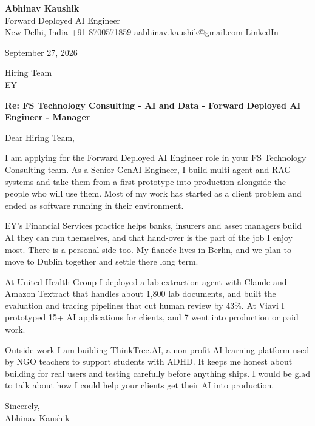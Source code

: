 \documentclass[11pt,a4paper]{article}
\begin{document}
{\Large\bfseries Abhinav Kaushik}\\
Forward Deployed AI Engineer\\
New Delhi, India \textbar{} +91 8700571859 \textbar{} \href{mailto:aabhinav.kaushik@gmail.com}{aabhinav.kaushik@gmail.com} \textbar{} \href{https://www.linkedin.com/in/abhinav-kaushik10/}{LinkedIn}  

September 27, 2026

Hiring Team\\
EY

\textbf{Re: FS Technology Consulting - AI and Data - Forward Deployed AI Engineer - Manager}

Dear Hiring Team,

I am applying for the Forward Deployed AI Engineer role in your FS Technology Consulting team. As a Senior GenAI Engineer, I build multi-agent and RAG systems and take them from a first prototype into production alongside the people who will use them. Most of my work has started as a client problem and ended as software running in their environment.

EY's Financial Services practice helps banks, insurers and asset managers build AI they can run themselves, and that hand-over is the part of the job I enjoy most. There is a personal side too. My fiancée lives in Berlin, and we plan to move to Dublin together and settle there long term.

At United Health Group I deployed a lab-extraction agent with Claude and Amazon Textract that handles about 1,800 lab documents, and built the evaluation and tracing pipelines that cut human review by 43\%. At Viavi I prototyped 15+ AI applications for clients, and 7 went into production or paid work.

Outside work I am building ThinkTree.AI, a non-profit AI learning platform used by NGO teachers to support students with ADHD. It keeps me honest about building for real users and testing carefully before anything ships. I would be glad to talk about how I could help your clients get their AI into production.

Sincerely,\\[4pt]
Abhinav Kaushik
\end{document}
